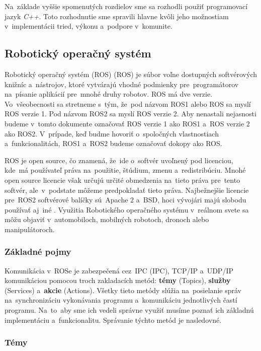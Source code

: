 Na~základe vyššie spomenutých rozdielov sme sa rozhodli použiť programovací jazyk \textit{C++}. Toto rozhodnutie sme spravili
hlavne kvôli jeho možnostiam v~implementácii tried, výkonu a~podpore v~komunite.

\subsection{Robotický operačný systém}
\label{sec:ros}

Robotický operačný systém (ROS) (\acrlong{ROS}) je súbor voľne dostupných softvérových knižníc a~nástrojov, ktoré vytvárajú
vhodné podmienky pre~programátorov na~písanie aplikácií pre~mnohé druhy robotov. ROS má dve verzie. Vo~všeobecnosti sa stretneme
s~tým, že~pod názvom ROS1 alebo ROS sa myslí ROS verzie 1. Pod názvom ROS2 sa myslí ROS verzie 2. Aby nenastali nejasnosti
budeme v~tomto dokumente označovať ROS verzie 1 ako ROS1 a~ROS verzie 2 ako ROS2. V~prípade, keď budme hovoriť o~spoločných
vlastnostiach a~funkcionalitách, ROS1 a~ROS2 budeme označovať dokopy ako ROS.

ROS je open source, čo znamená, že~ide o~softvér uvoľnený pod licenciou, kde~má používateľ práva na~použitie,
štúdium, zmenu a~redistribúciu. Mnohé open source licencie však určujú určité obmedzenia na~tieto práva pre~tento softvér,
ale~v~podstate môžeme predpokladať tieto práva. Najbežnejšie licencie pre~ROS2 softvérové balíčky sú~Apache 2 a~BSD,
hoci vývojári majú slobodu používať aj~iné \cite{ROS2book}. Využitia Robotického operačného systému v~reálnom svete sa môžu
objaviť v~automobiloch, mobilných robotoch, dronoch alebo manipulátoroch.

\subsubsection{Základné pojmy}
\label{sec:zakladne_pojmy}

Komunikácia v~ROSe je zabezpečená cez~IPC (\acrlong{IPC}), TCP/IP a~UDP/IP komunikáciou pomocou troch zakladacích metód:
\textbf{témy} (Topics), \textbf{služby} (Services) a~\textbf{akcie} (Actions).
Všetky tieto metódy slúžia na~posielanie správ na~synchronizáciu vykonávania programu a~komunikáciu jednotlivých častí programu.
Na~to~aby sme ich vedeli správne využiť musíme poznať ich základnú implementáciu a~funkcionalitu. Správanie týchto metód je nasledovné.

\subsubsection{Témy}
\label{sec:topic}

